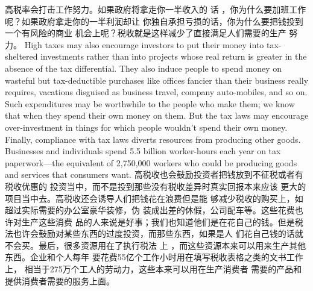 \begin{paracol}{2}
\switchcolumn
高税率会打击工作努力。如果政府将拿走你一半收入的
话 ，你为什么要加班工作呢？如果政府拿走你的一半利润却让
你独自承担亏损的话，你为什么要把钱投到一个有风险的商业
机会上呢？税收就是这样减少了直接满足人们需要的生产
努力。
\switchcolumn*
High taxes may also encourage investors to put their money
into tax-sheltered investments rather than into projects whose
real return is greater in the absence of the tax differential. They
also induce people to spend money on wasteful but tax-deductible purchases like offices fancier than their business really
requires, vacations disguised as business travel, company auto-mobiles, and so on. Such expenditures may be worthwhile to
the people who make them; we know that when they spend
their own money on them. But the tax laws may encourage
over-investment in things for which people wouldn't spend their
own money. Finally, compliance with tax laws diverts resources
from producing other goods. Businesses and individuals spend
5.5 billion worker-hours each year on tax paperwork---the
equivalent of 2,750,000 workers who could be producing
goods and services that consumers want.
\switchcolumn
高税收也会鼓励投资者把钱放到不征税或者有税收优惠的
投资当中，而不是投到那些没有税收差异时真实回报本来应该
更大的项目当中去。高税收还会诱导人们把钱花在浪费但是能
够减少税收的购买上，如超过实际需要的办公室豪华装修，伪
装成出差的休假，公司配车等。这些花费也许对生产这些消费
品的人来说是好事；我们也知道他们是在花自己的钱。但是税
法也许会鼓励对某些东西的过度投资，而那些东西，如果是人
们花自己钱的话就不会买。最后，很多资源用在了执行税法
上 ，而这些资源本来可以用来生产其他东西。企业和个人每年
要花费55亿个工作小时用在填写税收表格之类的文书工作上，
相当于275万个工人的劳动力，这些本来可以用在生产消费者
需要的产品和提供消费者需要的服务上面。


\end{paracol}
